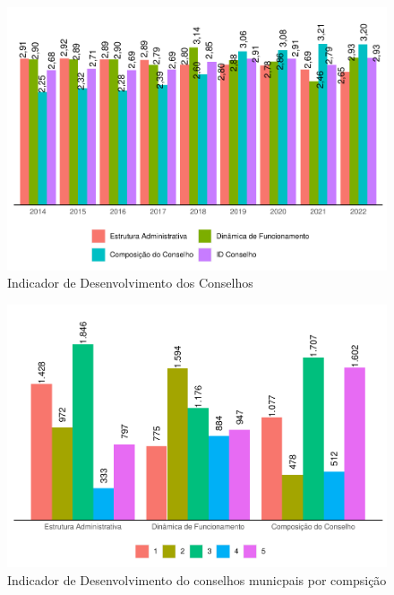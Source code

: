 \documentclass[
  brazilian]{report}
\begin{document}
\begin{figure}
\includegraphics{Censo-SUAS-2022_files/figure-latex/idconselho-1} \caption[Indicador de Desenvolvimento dos Conselhos]{Indicador de Desenvolvimento dos Conselhos}\label{fig:idconselho}
\end{figure}

\begin{figure}
\includegraphics{Censo-SUAS-2022_files/figure-latex/idcon-1} \caption[Indicador de Desenvolvimento do conselhos municpais por compsição]{Indicador de Desenvolvimento do conselhos municpais por compsição}\label{fig:idcon}
\end{figure}
\end{document}

